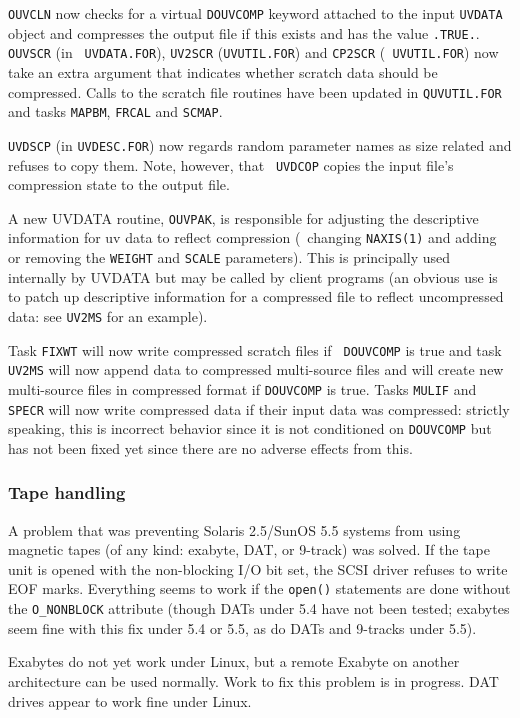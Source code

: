{\tt OUVCLN} now checks for a virtual {\tt DOUVCOMP} keyword attached
to the input {\tt UVDATA} object and compresses the output file if
this exists and has the value {\tt .TRUE.}.  {\tt OUVSCR} (in {\tt
UVDATA.FOR}), {\tt UV2SCR} ({\tt UVUTIL.FOR}) and {\tt CP2SCR} ({\tt
UVUTIL.FOR}) now take an extra argument that indicates whether scratch
data should be compressed.  Calls to the scratch file routines have
been updated in {\tt QUVUTIL.FOR} and tasks {\tt MAPBM}, {\tt FRCAL}
and {\tt SCMAP}.

{\tt UVDSCP} (in {\tt UVDESC.FOR}) now regards random parameter names
as size related and refuses to copy them.  Note, however, that {\tt
UVDCOP} copies the input file's compression state to the output file.

A new UVDATA routine, {\tt OUVPAK}, is responsible for adjusting the
descriptive information for uv data to reflect compression (\ie\
changing {\tt NAXIS(1)} and adding or removing the {\tt WEIGHT} and
{\tt SCALE} parameters).  This is principally used internally by
UVDATA but may be called by client programs (an obvious use is to
patch up descriptive information for a compressed file to reflect
uncompressed data: see {\tt UV2MS} for an example).

Task {\tt FIXWT} will now write compressed scratch files if {\tt
DOUVCOMP} is true and task {\tt UV2MS} will now append data to
compressed multi-source files and will create new multi-source files
in compressed format if {\tt DOUVCOMP} is true.  Tasks {\tt MULIF} and
{\tt SPECR} will now write compressed data if their input data was
compressed: strictly speaking, this is incorrect behavior since it is
not conditioned on {\tt DOUVCOMP} but has not been fixed yet since
there are no adverse effects from this.


\subsubsection{Tape handling}

A problem that was preventing Solaris 2.5/SunOS 5.5 systems from using
magnetic tapes (of any kind: exabyte, DAT, or 9-track) was solved.  If
the tape unit is opened with the non-blocking I/O bit set, the SCSI
driver refuses to write EOF marks.  Everything seems to work if the
{\tt open()} statements are done without the {\tt O\_NONBLOCK}
attribute (though DATs under 5.4 have not been tested; exabytes seem
fine with this fix under 5.4 or 5.5, as do DATs and 9-tracks under
5.5).

Exabytes do not yet work under Linux, but a remote Exabyte on another
architecture can be used normally. Work to fix this problem is in
progress. DAT drives appear to work fine under Linux.

